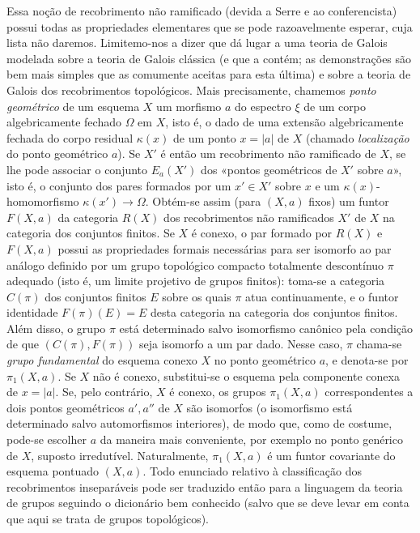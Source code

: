 \documentclass[11pt,twoside,openany]{book}
\numberwithin{equation}{section}
\newcommand{\src}[1]{%
  \phantomsection\hypertarget{src:#1}{}%
  \marginpar{\raggedleft\footnotesize\sffamily #1}%
}
\theoremstyle{plain}
\theoremstyle{definition}
\theoremstyle{remark}
\newcommand{\FgaUnitKey}{frontmatter}
\renewcommand{\src}[1]{%
  \phantomsection\hypertarget{src:\FgaUnitKey:#1}{}%
  \marginpar{\raggedleft\footnotesize\sffamily #1}%
}
\begin{document}
\src{210}
Essa noção de recobrimento não ramificado (devida a Serre e ao conferencista)
possui todas as propriedades elementares que se pode razoavelmente esperar, cuja
lista não daremos. Limitemo-nos a dizer que dá lugar a uma teoria de Galois
modelada sobre a teoria de Galois clássica (e que a contém; as
demonstrações são bem mais simples que as comumente aceitas para
esta última) e sobre a teoria de Galois dos recobrimentos topológicos. Mais
precisamente, chamemos \emph{ponto geométrico} de um esquema $X$ um morfismo
$a$ do espectro $\xi$ de um corpo algebricamente fechado $\Omega$ em $X$,
isto é, o dado de uma extensão algebricamente fechada do corpo residual
$\kappa(x)$ de um ponto $x=|a|$ de $X$ (chamado \emph{localização} do ponto
geométrico $a$). Se $X'$ é então um recobrimento não ramificado de $X$, se
lhe pode associar o conjunto $E_a(X')$ dos «pontos geométricos de $X'$ sobre
$a$», isto é, o conjunto dos pares formados por um $x'\in X'$ sobre $x$
e um $\kappa(x)$-homomorfismo $\kappa(x')\longrightarrow\Omega$. Obtém-se assim
(para $(X,a)$ fixos) um funtor $F(X,a)$ da categoria $R(X)$ dos
recobrimentos não ramificados $X'$ de $X$ na categoria dos conjuntos
finitos. Se $X$ é conexo, o par formado por $R(X)$ e $F(X,a)$ possui as
propriedades formais necessárias para ser isomorfo ao par análogo definido por
um grupo topológico compacto totalmente descontínuo $\pi$ adequado (isto é,
um limite projetivo de grupos finitos): toma-se a categoria $C(\pi)$ dos
conjuntos finitos $E$ sobre os quais $\pi$ atua continuamente, e o funtor
identidade $F(\pi)(E)=E$ desta categoria na categoria dos conjuntos
finitos. Além disso, o grupo $\pi$ está determinado salvo isomorfismo canônico pela
condição de que $(C(\pi),F(\pi))$ seja isomorfo a um par dado. Nesse caso,
$\pi$ chama-se \emph{grupo fundamental} do esquema conexo $X$ no ponto
geométrico $a$, e denota-se por $\pi_1(X,a)$. Se $X$ não é conexo, substitui-se
o esquema pela componente conexa de $x=|a|$. Se, pelo contrário, $X$ é
conexo, os grupos $\pi_1(X,a)$ correspondentes a dois pontos geométricos
$a',a''$ de $X$ são isomorfos (o isomorfismo está determinado salvo
automorfismos interiores), de modo que, como de costume, pode-se escolher $a$
da maneira mais conveniente, por exemplo no ponto genérico de $X$, suposto
irredutível. Naturalmente, $\pi_1(X,a)$ é um funtor covariante do esquema
pontuado $(X,a)$. Todo enunciado relativo à classificação dos
recobrimentos inseparáveis pode ser traduzido então para a linguagem da teoria de
grupos seguindo o dicionário bem conhecido (salvo que se deve levar em conta
que aqui se trata de grupos topológicos).
\end{document}
